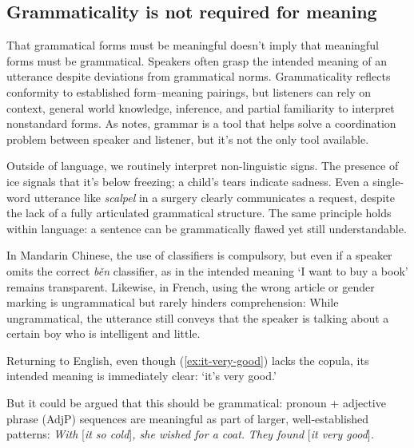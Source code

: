 \documentclass[12pt,letterpaper]{article}
\begin{document}
\subsection{Grammaticality is not required for meaning}\label{sec:ungrammatical-meaning}



That grammatical forms must be meaningful doesn't imply that meaningful forms must be grammatical. Speakers often grasp the intended meaning of an utterance despite deviations from grammatical norms. Grammaticality reflects conformity to established form--meaning pairings, but listeners can rely on context, general world knowledge, inference, and partial familiarity to interpret nonstandard forms. As \textcite[2]{scottphillips2024communication} notes, grammar is a tool that helps solve a coordination problem between speaker and listener, but it's not the only tool available.

Outside of language, we routinely interpret non-linguistic signs. The presence of ice signals that it's below freezing; a child's tears indicate sadness. Even a single-word utterance like \textit{scalpel} in a surgery clearly communicates a request, despite the lack of a fully articulated grammatical structure. The same principle holds within language: a sentence can be grammatically flawed yet still understandable.

In Mandarin Chinese, the use of classifiers is compulsory, but even if a speaker omits the correct \textit{běn} classifier, as in
\z
the intended meaning `I want to buy a book’ remains transparent. Likewise, in French, using the wrong article or gender marking is ungrammatical but rarely hinders comprehension:
\z
While ungrammatical, the utterance still conveys that the speaker is talking about a certain boy who is intelligent and little.

Returning to English, even though (\ref{ex:it-very-good}) lacks the copula, its intended meaning is immediately clear: `it's very good.’ 

\label{ex:it-very-good}
\z

\noindent But it could be argued that this should be grammatical: pronoun + adjective phrase (AdjP) sequences are meaningful as part of larger, well-established patterns:
\ea
    \ea \textit{With }[\textit{it so cold}]\textit{, she wished for a coat.}
    \ex \textit{They found }[\textit{it very good}]\textit{.}
    \z
\z
\end{document}

